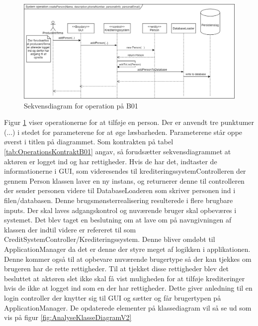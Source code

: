 \begin{figure}
    \centering
    \includegraphics[scale = 0.37]{images/B01OSD.png}
    \caption{Sekvensdiagram for operation på B01}
    \label{fig:OperationsSekvensDiagramB01}
\end{figure}

Figur \ref{fig:OperationsSekvensDiagramB01} viser operationerne for at tilføje en person. Der er anvendt tre punktumer (...) i stedet for parameterene for at øge læsbarheden. Parameterene står oppe øverst i titlen på diagrammet. Som kontrakten på tabel \ref{tab:OperationsKontraktB01} angav, så forudsætter sekvensdiagrammet at aktøren er logget ind og har rettigheder. Hvis de har det, indtaster de informationerne i GUI, som videresendes til krediteringssystemControlleren der gennem Person klassen laver en ny instans, og returnerer denne til controlleren der sender personen videre til DatabaseLoaderen som skriver personen ind i filen/databasen.
Denne brugsmønsterrealisering resulterede i flere brugbare inputs. Der skal laves adgangskontrol og nuværende bruger skal opbeværes i systemet. Det blev taget en beslutning om at lave om på navngivningen af klassen der indtil videre er refereret til som CreditSystemController/Krediteringssystem. Denne bliver omdøbt til ApplicationManager da det er denne der styre meget af logikken i applikationen. Denne kommer også til at opbevare nuværende brugertype så der kan tjekkes om brugeren har de rette rettigheder. Til at tjekket disse rettigheder blev det besluttet at aktøren slet ikke skal få vist muligheden for at tilføje krediteringer hvis de ikke at logget ind som en der har rettigheder. Dette giver anledning til en login controller der knytter sig til GUI og sætter og får brugertypen på ApplicationManager. De opdaterede elementer på klassediagram vil så se ud som vis på figur \ref{fig:AnalyseKlasseDiagramV2}


